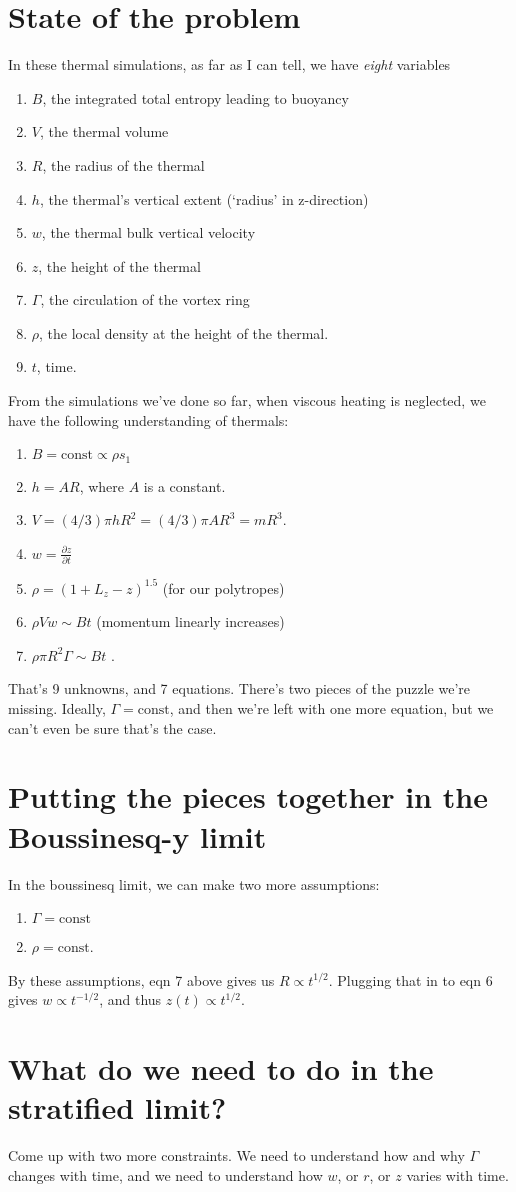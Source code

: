 \documentclass[onecolumn, amsmath, amsfonts, amssymb]{aastex62}
\begin{document}
\section{State of the problem}
In these thermal simulations, as far as I can tell, we have \emph{eight} variables
\begin{enumerate}
\item $B$, the integrated total entropy leading to buoyancy
\item $V$, the thermal volume
\item $R$, the radius of the thermal
\item $h$, the thermal's vertical extent (`radius' in z-direction)
\item $w$, the thermal bulk vertical velocity
\item $z$, the height of the thermal
\item $\Gamma$, the circulation of the vortex ring
\item $\rho$, the local density at the height of the thermal.
\item $t$, time.
\end{enumerate}
From the simulations we've done so far, when viscous heating is neglected, we have the
following understanding of thermals:
\begin{enumerate}
\item $B = \text{const} \propto \rho s_1$
\item $h = A R$, where $A$ is a constant.
\item $V = (4/3)\pi h R^2 = (4/3)\pi A R^3 = m R^3$.
\item $w = \frac{\partial z}{\partial t}$
\item $\rho = (1 + L_z - z)^{1.5}$ (for our polytropes)
\item $\rho V w \sim B t$ (momentum linearly increases)
\item $\rho \pi R^2 \Gamma \sim B t$ \citep[e.g., eqn 36 of ][]{shivamoggi2010}.
\end{enumerate}
That's 9 unknowns, and 7 equations. There's two pieces of the puzzle we're missing.
Ideally, $\Gamma = \text{const}$, and then we're left with one more equation, but we
can't even be sure that's the case. 

\section{Putting the pieces together in the Boussinesq-y limit}
In the boussinesq limit, we can make two more assumptions:
\begin{enumerate}
\item $\Gamma = \text{const}$
\item $\rho = \text{const}$.
\end{enumerate}
By these assumptions, eqn 7 above gives us $R \propto t^{1/2}$. Plugging that in to 
eqn 6 gives $w \propto t^{-1/2}$, and thus $z(t) \propto t^{1/2}$. 

\section{What do we need to do in the stratified limit?}
Come up with two more constraints. We need to understand how and why $\Gamma$ changes with
time, and we need to understand how $w$, or $r$, or $z$ varies with time.



\end{document}
